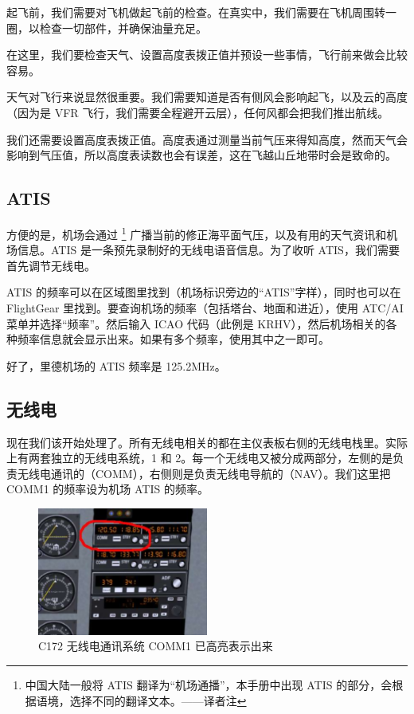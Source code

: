 起飞前，我们需要对飞机做起飞前的检查。在真实中，我们需要在飞机周围转一圈，以检查一切部件，并确保油量充足。

在这里，我们要检查天气、设置高度表拨正值并预设一些事情，飞行前来做会比较容易。

天气对飞行来说显然很重要。我们需要知道是否有侧风会影响起飞，以及云的高度（因为是 VFR 飞行，我们需要全程避开云层），任何风都会把我们推出航线。

我们还需要设置高度表拨正值。高度表通过测量当前气压来得知高度，然而天气会影响到气压值，所以高度表读数也会有误差，这在飞越山丘地带时会是致命的。

\subsection{ATIS}

方便的是，机场会通过 \footnote{中国大陆一般将 ATIS 翻译为“机场通播”，本手册中出现 ATIS 的部分，会根据语境，选择不同的翻译文本。——译者注} 广播当前的修正海平面气压，以及有用的天气资讯和机场信息。ATIS 是一条预先录制好的无线电语音信息。为了收听 ATIS，我们需要首先调节无线电。

ATIS 的频率可以在区域图里找到（机场标识旁边的“ATIS”字样），同时也可以在 FlightGear 里找到。要查询机场的频率（包括塔台、地面和进近），使用 ATC/AI 菜单并选择“频率”。然后输入 ICAO 代码（此例是 KRHV），然后机场相关的各种频率信息就会显示出来。如果有多个频率，使用其中之一即可。

好了，里德机场的 ATIS 频率是 125.2MHz。

\subsection{无线电}

现在我们该开始处理了。所有无线电相关的都在主仪表板右侧的无线电栈里。实际上有两套独立的无线电系统，1 和 2。每一个无线电又被分成两部分，左侧的是负责无线电通讯的（COMM），右侧则是负责无线电导航的（NAV）。我们这里把 COMM1 的频率设为机场 ATIS 的频率。

\begin{figure}[!htp]
\centering
\includegraphics[width=0.5\textwidth]{comm1}
\caption{C172 无线电通讯系统 COMM1 已高亮表示出来\label{comm1}}
\end{figure}

